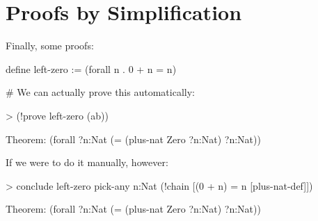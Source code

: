 \section{Proofs by Simplification}

Finally, some proofs:
\begin{tcAthena}
define left-zero := (forall n . 0 + n = n)

# We can actually prove this automatically: 

> (!prove left-zero (ab))

Theorem: (forall ?n:Nat
           (= (plus-nat Zero ?n:Nat)
              ?n:Nat))
\end{tcAthena}
If we were to do it manually, however:
\begin{tcAthena}
> conclude left-zero
    pick-any n:Nat 
      (!chain [(0 + n) = n [plus-nat-def]])

Theorem: (forall ?n:Nat
           (= (plus-nat Zero ?n:Nat)
              ?n:Nat))
\end{tcAthena}


